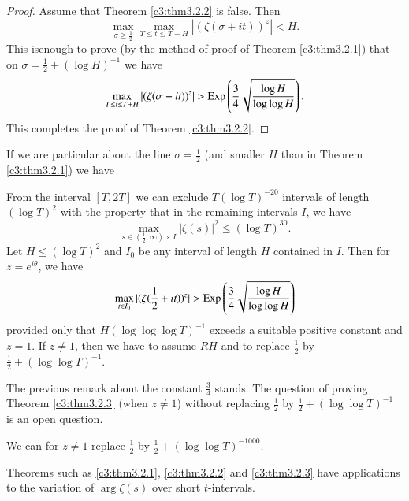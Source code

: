 \begin{proof}
Assume that Theorem \ref{c3:thm3.2.2} is false. Then
$$
\max\limits_{\sigma \geq \frac{1}{2}} \max\limits_{T \leq t \leq T + H} |(\zeta(\sigma + it))^z| < H. 
$$
This is\pageoriginale enough to prove (by the method of proof of Theorem \ref{c3:thm3.2.1}) that on $\sigma = \frac{1}{2} + (\log H)^{-1}$ we have
$$
\max\limits_{T \leq t \leq T + H} |(\zeta(\sigma + it))^z| > \operatorname{Exp} \left(\frac{3}{4} \sqrt{\frac{\log H}{\log \log H}} \right).
$$
This completes the proof of Theorem \ref{c3:thm3.2.2}.
\end{proof}

If we are particular about the line $\sigma =\frac{1}{2}$ (and smaller $H$ than in Theorem \ref{c3:thm3.2.1}) we have

\begin{theorem}\label{c3:thm3.2.3}
From the interval $[T,2T]$ we can exclude $T (\log T)^{-20}$ intervals of length $(\log T)^2$ with the property that in the remaining intervals $I$, we have
\begin{equation*}
\max\limits_{s \in (\frac{1}{2}, \infty) \times I} |\zeta(s)|^2 \leq (\log T)^{30}.  \tag{3.2.13}\label{c3:eq3.2.13}
\end{equation*}
Let $H \leq (\log T)^2$ and $I_0$ be any interval of length $H$ contained in $I$. Then for $z =e^{i\theta}$, we have
$$
\max\limits_{t \in I_0} |(\zeta(\frac{1}{2} + it))^z| > \operatorname{Exp} \left( \frac{3}{4} \sqrt{\frac{\log H}{\log \log H}}\right)
$$
provided only that $H(\log \log \log T)^{-1}$ exceeds a suitable positive constant and $z=1$. If $z \neq 1$, then we have to assume $RH$ and to replace $\frac{1}{2}$ by $\frac{1}{2} + (\log \log T)^{-1}$.
\end{theorem}

\setcounter{remark}{0}
\begin{remark}%
The previous remark about the constant $\frac{3}{4}$ stands. The question of proving Theorem \ref{c3:thm3.2.3} (when $z \neq 1$) without replacing $\frac{1}{2}$ by $\frac{1}{2} + (\log \log T)^{-1}$ is an open question.
\end{remark}

\begin{remark}%
We can for $z \neq 1$ replace $\frac{1}{2}$ by $\frac{1}{2} + (\log \log T)^{-1000}$.
\end{remark}

\begin{remark}%
Theorems such as \ref{c3:thm3.2.1}, \ref{c3:thm3.2.2} and \ref{c3:thm3.2.3} have applications to the variation of $\arg \zeta(s)$ over short $t$-intervals.
\end{remark}

